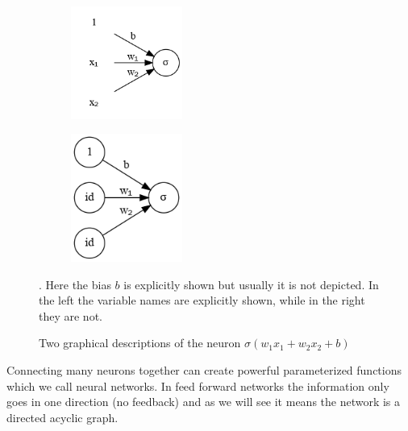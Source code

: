 \documentclass[11pt, a4paper]{report}
\theoremstyle{plain}
\theoremstyle{definition}
\theoremstyle{remark}
\begin{document}
\begin{figure}[!h]
\begin{framed}
\centering
\begin{subfigure}[b]{0.45\textwidth}
\includegraphics[width=0.4\textwidth]{./plots/neuron.gv.png}
\end{subfigure}
\begin{subfigure}[b]{0.45\textwidth}
\includegraphics[width=0.4\textwidth]{./plots/neuron.2.gv.png}
\end{subfigure}
\caption{Two graphical descriptions of the neuron
$\sigma(w_1x_1 + w_2x_2 + b)$}. Here the bias $b$ is explicitly shown
but usually it is not depicted. In the left the variable names are explicitly
shown, while in the right they are not.
\label{fig:neuron2}
\end{framed}
\end{figure}

Connecting many neurons together can create powerful parameterized
functions which we call neural networks.
In feed forward networks the information only goes in one direction (no
feedback) and as we will see it means the network is a directed acyclic graph.
\end{document}
